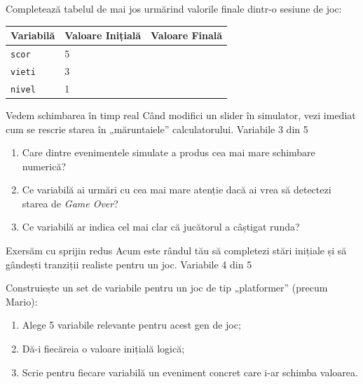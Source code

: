 \begin{guidebox}
Completează tabelul de mai jos urmărind valorile finale dintr-o sesiune de joc:
\begin{center}
\begin{tabular}{lll}
\toprule
Variabilă & Valoare Inițială & Valoare Finală \\
\midrule
\texttt{scor} & 5 & \\
\texttt{vieti} & 3 & \\
\texttt{nivel} & 1 & \\
\bottomrule
\end{tabular}
\end{center}
\end{guidebox}

\clearpage

\PageHeader
  {Vedem schimbarea în timp real}
  {Când modifici un slider în simulator, vezi imediat cum se rescrie starea în „măruntaiele” calculatorului.}
  {Variabile 3 din 5}


\begin{semibox}
\begin{enumerate}
\item Care dintre evenimentele simulate a produs cea mai mare schimbare numerică?
\item Ce variabilă ai urmări cu cea mai mare atenție dacă ai vrea să detectezi starea de \textit{Game Over}?
\item Ce variabilă ar indica cel mai clar că jucătorul a câștigat runda?
\end{enumerate}
\end{semibox}

\clearpage

\PageHeader
  {Exersăm cu sprijin redus}
  {Acum este rândul tău să completezi stări inițiale și să gândești tranziții realiste pentru un joc.}
  {Variabile 4 din 5}

\begin{semibox}
Construiește un set de variabile pentru un joc de tip „platformer” (precum Mario):
\begin{enumerate}
\item Alege 5 variabile relevante pentru acest gen de joc;
\item Dă-i fiecăreia o valoare inițială logică;
\item Scrie pentru fiecare variabilă un eveniment concret care i-ar schimba valoarea.
\end{enumerate}
\end{semibox}

